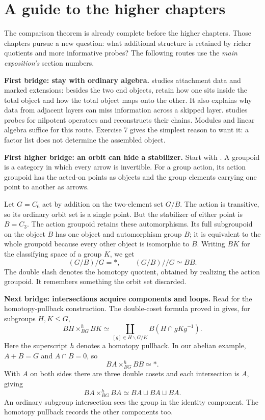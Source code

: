 \clearpage
\section{A guide to the higher chapters}\label{c:higher}
The comparison theorem is already complete before the higher chapters.
Those chapters pursue a new question: what additional structure is retained
by richer quotients and more informative probes? The following routes use
the \emph{main exposition's} section numbers.

\textbf{First bridge: stay with ordinary algebra.}
 studies attachment data and marked extensions:
besides the two end objects, retain how one sits inside the total object
and how the total object maps onto the other. It also explains why data
from adjacent layers can miss information across a skipped layer.
 studies probes for nilpotent operators and
reconstructs their chains. Modules and linear algebra suffice for this
route. Exercise 7 gives the simplest reason to want it: a factor list
does not determine the assembled object.

\textbf{First higher bridge: an orbit can hide a stabilizer.}
Start with . A groupoid is a category in which
every arrow is invertible. For a group action, its action groupoid has
the acted-on points as objects and the group elements carrying one point
to another as arrows.

Let \(G=C_6\) act by addition on the two-element set \(G/B\).
The action is transitive, so its ordinary orbit set is a single point.
But the stabilizer of either point is \(B=C_3\). The action groupoid
retains these automorphisms. Its full subgroupoid on the object \(B\)
has one object and automorphism group \(B\); it is equivalent to the
whole groupoid because every other object is isomorphic to \(B\).
Writing \(BK\) for the classifying space of a group \(K\), we get
\[
 (G/B)/G=*,\qquad (G/B)//G\simeq BB.
\]
The double slash denotes the homotopy quotient, obtained by realizing
the action groupoid. It remembers something the orbit set discarded.

\textbf{Next bridge: intersections acquire components and loops.}
Read  for the homotopy-pullback construction.
The double-coset formula proved in  gives,
for subgroups \(H,K\leq G\),
\[
 BH\times^h_{BG}BK
 \simeq\coprod_{[g]\in H\backslash G/K} B(H\cap gKg^{-1}).
\]
Here the superscript \(h\) denotes a homotopy pullback. In our abelian
example, \(A+B=G\) and \(A\cap B=0\), so
\[
 BA\times^h_{BG}BB\simeq *.
\]
With \(A\) on both sides there are three double cosets and each
intersection is \(A\), giving
\[
 BA\times^h_{BG}BA\simeq BA\sqcup BA\sqcup BA.
\]
An ordinary subgroup intersection sees the group in the identity
component. The homotopy pullback records the other components too.

